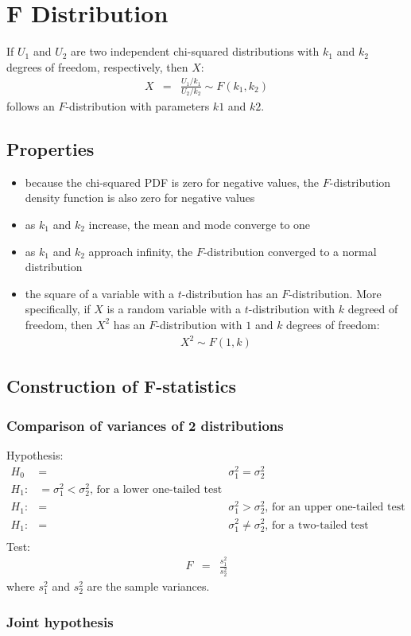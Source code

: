 \chapter{F Distribution}
If $U_{1}$ and $U_{2}$ are two independent chi-squared distributions with $k_{1}$ and $k_{2}$ degrees of freedom, respectively, then $X$:
\begin{eqnarray}
	X &=& \frac{U_{1} / k_{1}}{U_{2} / k_{2}} \sim F(k_{1}, k_{2})
\end{eqnarray}
follows an $F$-distribution with parameters $k1$ and $k2$.

\section{Properties}
\begin{itemize}
	\item because the chi-squared PDF is zero for negative values, the $F$-distribution density function is also zero for negative values
	\item as $k_{1}$ and $k_{2}$ increase, the mean and mode converge to one
	\item as $k_{1}$ and $k_{2}$ approach infinity, the $F$-distribution converged to a normal distribution
	\item the square of a variable with a $t$-distribution has an $F$-distribution. More specifically, if $X$ is a random variable with a $t$-distribution with $k$ degreed of freedom, then $X^{2}$ has an $F$-distribution with $1$ and $k$ degrees of freedom:
	\begin{eqnarray}
		X^{2} \sim F(1, k)
	\end{eqnarray}
\end{itemize}

\section{Construction of F-statistics}

\subsection{Comparison of variances of 2 distributions}
Hypothesis:
\begin{eqnarray}
	\nonumber
	H_{0} &=& \sigma_{1}^{2} = \sigma_{2}^{2}\\
	\nonumber
	H_{1}: &= \sigma_{1}^{2} < \sigma_{2}^{2}\text{, for a lower one-tailed test}\\
	\nonumber
	H_{1}: &=& \sigma_{1}^{2} > \sigma_{2}^{2}\text{, for an upper one-tailed test}\\
	\nonumber
	H_{1}: &=& \sigma_{1}^{2} \neq \sigma_{2}^{2}\text{, for a two-tailed test}\\
\end{eqnarray}
Test:
\begin{eqnarray}
	F &=& \frac{s_{1}^{2}}{s_{2}^{2}}
\end{eqnarray}
where $s_{1}^{2}$ and $s_{2}^{2}$ are the sample variances.

\subsection{Joint hypothesis}

